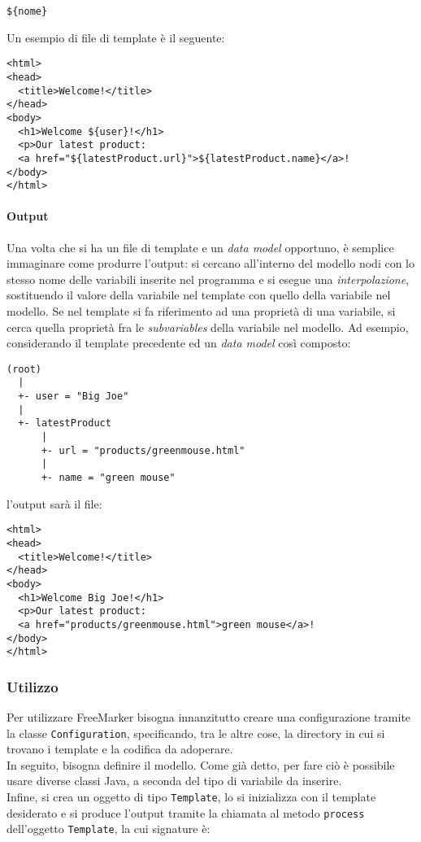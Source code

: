\begin{lstlisting}
${nome}
\end{lstlisting}

Un esempio di file di template è il seguente:

\begin{lstlisting}
<html>
<head>
  <title>Welcome!</title>
</head>
<body>
  <h1>Welcome ${user}!</h1>
  <p>Our latest product:
  <a href="${latestProduct.url}">${latestProduct.name}</a>!
</body>
</html>
\end{lstlisting}

\paragraph{Output}
Una volta che si ha un file di template e un \textit{data model} opportuno, è semplice immaginare come produrre l'output: si cercano all'interno del modello nodi con lo stesso nome delle variabili inserite nel programma e si esegue una \textsl{interpolazione}, sostituendo il valore della variabile nel template con quello della variabile nel modello. Se nel template si fa riferimento ad una proprietà di una variabile, si cerca quella proprietà fra le \textit{subvariables} della variabile nel modello. Ad esempio, considerando il template precedente ed un \textit{data model} così composto:

\begin{lstlisting}
(root)
  |
  +- user = "Big Joe"
  |
  +- latestProduct
      |
      +- url = "products/greenmouse.html"
      |
      +- name = "green mouse"  
\end{lstlisting}

l'output sarà il file:

\begin{lstlisting}
<html>
<head>
  <title>Welcome!</title>
</head>
<body>
  <h1>Welcome Big Joe!</h1>
  <p>Our latest product:
  <a href="products/greenmouse.html">green mouse</a>!
</body>
</html>
\end{lstlisting}

\subsubsection{Utilizzo}
Per utilizzare FreeMarker bisogna innanzitutto creare una configurazione tramite la classe \lstinline{Configuration}, specificando, tra le altre cose, la directory in cui si trovano i template e la codifica da adoperare.\\
In seguito, bisogna definire il modello. Come già detto, per fare ciò è possibile usare diverse classi Java, a seconda del tipo di variabile da inserire.\\
Infine, si crea un oggetto di tipo \lstinline{Template}, lo si inizializza con il template desiderato e si produce l'output tramite la chiamata al metodo \lstinline{process} dell'oggetto \lstinline{Template}, la cui signature è:

